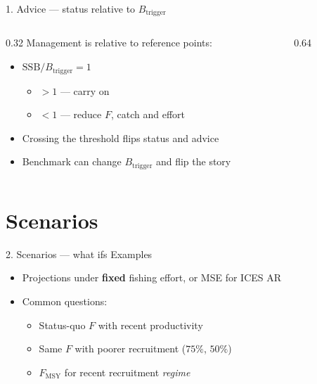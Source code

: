 \documentclass[12pt,aspectratio=169]{beamer}
\begin{document}
\begin{frame}{1. Advice --- status relative to $B_{\mathrm{trigger}}$}
  \begin{columns}[T]
    \begin{column}{0.32\textwidth}
      \footnotesize
      Management is relative to reference points:
      \vspace{1mm}
      \begin{itemize}
        \item $\mathrm{SSB}/B_{\mathrm{trigger}}=1$
        \begin{itemize}
          \item \textcolor{bimcarry}{$> 1$ --- carry on}
          \item \textcolor{bimreduce}{$<{ }1$ --- reduce $F$, catch and effort}
        \end{itemize}
        \item Crossing the threshold flips status and advice
        \item Benchmark can change $B_{\mathrm{trigger}}$ and flip the story
      \end{itemize}
    \end{column}
    \begin{column}{0.64\textwidth}
      \centering
      \\
    \end{column}
  \end{columns}
\end{frame}

\section{Scenarios}

\begin{frame}{2. Scenarios --- what ifs}
  Examples
  \begin{itemize}
    \item Projections under \textbf{fixed} fishing effort, or MSE for ICES AR
    \item Common questions:
      \begin{itemize}
        \item Status-quo $F$ with recent productivity
        \item Same $F$ with poorer recruitment ($75\%$, $50\%$)
        \item $F_{\mathrm{MSY}}$ for recent recruitment \emph{regime}
      \end{itemize}
  \end{itemize}
\end{frame}
\end{document}
